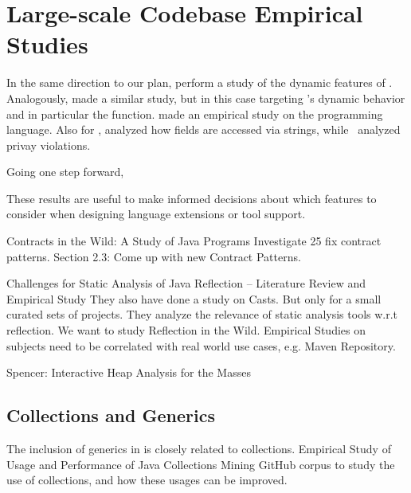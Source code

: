 \section{Large-scale Codebase Empirical Studies}

In the same direction to our plan, \cite{callau_how_2013} perform a study of the dynamic features of \smalltalk{}.
Analogously, \cite{richards_analysis_2010,richards_eval_2011} made a similar study, but in this case targeting \javascript{}'s dynamic behavior and in particular the \eval{} function.
\cite{reboucas_empirical_2016} made an empirical study on the \swift{} programming language.
Also for \javascript{}, \cite{madsen_string_2014} analyzed how fields are accessed via strings, while~\cite{jang_empirical_2010} analyzed privay violations.

Going one step forward, \cite{ray_large-scale_2017}

These results are useful to make informed decisions about which features to consider when designing language extensions or tool support.




Contracts in the Wild: A Study of Java Programs
Investigate 25 fix contract patterns.
Section 2.3: Come up with new Contract Patterns.
\cite{dietrich_contracts_2017,dietrich_contracts_2017-1}

\cite{landman_challenges_2017}
Challenges for Static Analysis of Java Reflection -- Literature Review and Empirical Study
They also have done a study on Casts.
But only for a small curated sets of projects.
They analyze the relevance of static analysis tools w.r.t reflection.
We want to study Reflection in the Wild.
Empirical Studies on subjects need to be correlated with real world use cases, e.g. Maven Repository.



Spencer: Interactive Heap Analysis for the Masses
\cite{brandauer_spencer:_2017}


\subsection*{Collections and Generics}

The inclusion of generics in \java{} is closely related to collections.
Empirical Study of Usage and Performance of Java Collections
Mining GitHub corpus to study the use of collections, and how these usages can be improved.
\cite{costa_empirical_2017}

